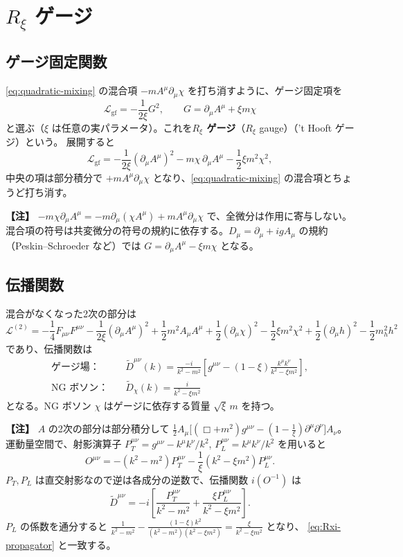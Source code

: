 \documentclass[uplatex,dvipdfmx,a4paper,11pt,openany]{jsbook}
\newcommand{\term}[2]{\textbf{#1}（#2）}
\newenvironment{note}{\vspace{1ex}\par\footnotesize\noindent\textbf{【注】}}{\par\vspace{1ex}}
\numberwithin{equation}{chapter}
\theoremstyle{definition}
\theoremstyle{plain}
\theoremstyle{remark}
\newcommand{\Lag}{\mathcal{L}}
\begin{document}
\section{$R_\xi$ ゲージ}
\label{sec:Rxi}
\subsection{ゲージ固定関数}
\eqref{eq:quadratic-mixing} の混合項 $-mA^\mu\partial_\mu\chi$ を打ち消すように、ゲージ固定項を
\begin{equation}
\Lag_{\mathrm{gf}}=-\frac{1}{2\xi}G^2,\qquad G=\partial_\mu A^\mu+\xi m\chi
\label{eq:Rxi-gf}
\end{equation}
と選ぶ（$\xi$ は任意の実パラメータ）。これを\term{$R_\xi$ ゲージ}{$R_\xi$ gauge}（'t Hooft ゲージ）という。
展開すると
\begin{equation}
\Lag_{\mathrm{gf}}=-\frac{1}{2\xi}(\partial_\mu A^\mu)^2-m\chi\,\partial_\mu A^\mu-\frac12\xi m^2\chi^2 ,
\end{equation}
中央の項は部分積分で $+mA^\mu\partial_\mu\chi$ となり、\eqref{eq:quadratic-mixing} の混合項とちょうど打ち消す。
\begin{note}
$-m\chi\partial_\mu A^\mu=-m\partial_\mu(\chi A^\mu)+mA^\mu\partial_\mu\chi$ で、全微分は作用に寄与しない。
混合項の符号は共変微分の符号の規約に依存する。$D_\mu=\partial_\mu+igA_\mu$ の規約（Peskin--Schroeder など）では
$G=\partial_\mu A^\mu-\xi m\chi$ となる。
\end{note}
\subsection{伝播関数}
混合がなくなった2次の部分は
\begin{equation}
\Lag^{(2)}=-\frac14F_{\mu\nu}F^{\mu\nu}-\frac{1}{2\xi}(\partial_\mu A^\mu)^2+\frac12m^2A_\mu A^\mu
+\frac12(\partial_\mu\chi)^2-\frac12\xi m^2\chi^2+\frac12(\partial_\mu h)^2-\frac12m_h^2h^2
\end{equation}
であり、伝播関数は
\begin{align}
\text{ゲージ場：}&\quad
\tilde D^{\mu\nu}(k)=\frac{-i}{k^2-m^2}\left[g^{\mu\nu}-(1-\xi)\frac{k^\mu k^\nu}{k^2-\xi m^2}\right],
\label{eq:Rxi-propagator}\\
\text{NG ボソン：}&\quad
\tilde D_\chi(k)=\frac{i}{k^2-\xi m^2}
\end{align}
となる。NG ボソン $\chi$ はゲージに依存する質量 $\sqrt\xi\,m$ を持つ。
\begin{note}
$A$ の2次の部分は部分積分して $\frac12A_\mu\bigl[(\Box+m^2)g^{\mu\nu}-(1-\frac1\xi)\partial^\mu\partial^\nu\bigr]A_\nu$。
運動量空間で、射影演算子 $P_T^{\mu\nu}=g^{\mu\nu}-k^\mu k^\nu/k^2$, $P_L^{\mu\nu}=k^\mu k^\nu/k^2$ を用いると
\[
O^{\mu\nu}=-(k^2-m^2)P_T^{\mu\nu}-\frac1\xi(k^2-\xi m^2)P_L^{\mu\nu}.
\]
$P_T,P_L$ は直交射影なので逆は各成分の逆数で、伝播関数 $i(O^{-1})$ は
\[
\tilde D^{\mu\nu}=-i\left[\frac{P_T^{\mu\nu}}{k^2-m^2}+\frac{\xi P_L^{\mu\nu}}{k^2-\xi m^2}\right].
\]
$P_L$ の係数を通分すると $\frac{1}{k^2-m^2}-\frac{(1-\xi)k^2}{(k^2-m^2)(k^2-\xi m^2)}=\frac{\xi}{k^2-\xi m^2}$ となり、
\eqref{eq:Rxi-propagator} と一致する。
\end{note}
\end{document}
